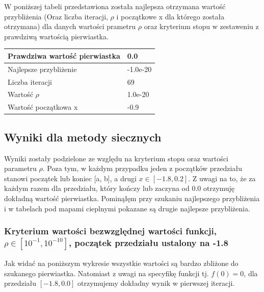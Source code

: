 \documentclass{article}
\begin{document}
\noindent
W poniższej tabeli przedstawiona została najlepsza otrzymana wartość przybliżenia (Oraz liczba iteracji, \(\rho\) i początkowe x dla którego została otrzymana) dla danych wartości prametru \(\rho\) oraz kryterium stopu w zestaweniu z prawdziwą wartością pierwiastka.

\begin{table}[H]
    \centering
    \begin{tabular}{|l|l|}
    \hline
        Prawdziwa wartość pierwiastka & 0.0 \\ \hline
        Najlepsze przybliżenie & -1.0e-20 \\ \hline
        Liczba iteracji & 69 \\ \hline
        Wartość $\rho$ & 1.0e-20 \\ \hline
        Wartość początkowa x & -0.9 \\ \hline
    \end{tabular}
\end{table}

\newpage

\subsection{Wyniki dla metody siecznych\textit{}}

Wyniki zostały podzielone ze względu na kryterium stopu oraz wartości parametru \(\rho\). Poza tym, w każdym przypadku jeden z początków przedziału stanowi początek lub koniec [a, b], a drugi \(x \in [-1.8, 0.2]\). Z uwagi na to, że za każdym razem dla przedziału, który kończy lub zaczyna od 0.0 otrzymuję dokładną wartość pierwiastka. Pominąłęm przy szukaniu najlepszego przybliżenia i w tabelach pod mapami cieplnymi pokazane są drugie najlepsze przybliżenia.

\subsubsection{Kryterium wartości bezwzględnej wartości funkcji, \(\rho \in [10^{-1}, 10^{-10}]\), początek przedziału ustalony na -1.8}

Jak widać na poniższym wykresie wszystkie wartości są bardzo zbliżone do szukanego pierwiastka. Natomiast z uwagi na specyfikę funkcji tj. \(f(0) = 0\), dla przedziału \([-1.8, 0.0]\) otrzymujemy dokładny wynik w pierwszej iteracji.
\end{document}
